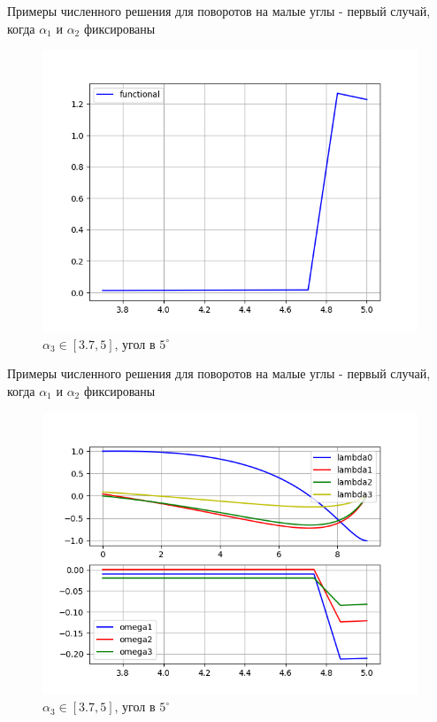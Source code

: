 \documentclass[10pt,utf8,presentation,notheorems,xcolor=dvipsnames,compress]{beamer}
\begin{document}
\begin{frame}{Примеры численного решения для поворотов на малые углы - первый случай, когда $\alpha_1$ и $\alpha_2$ фиксированы}
\begin{figure}[H]
\center\includegraphics[scale=0.5]{fig/functional_3_7-5_5.png}
\caption{$\alpha_3 \in [3.7, 5]$, угол в $5^{\circ}$}
\end{figure}
\end{frame}

\begin{frame}{Примеры численного решения для поворотов на малые углы - первый случай, когда $\alpha_1$ и $\alpha_2$ фиксированы}
\begin{figure}[H]
\center\includegraphics[scale=0.5]{fig/ivp_and_control_3_7-5_5.png}
\caption{$\alpha_3 \in [3.7, 5]$, угол в $5^{\circ}$}
\end{figure}
\end{frame}
\end{document}
